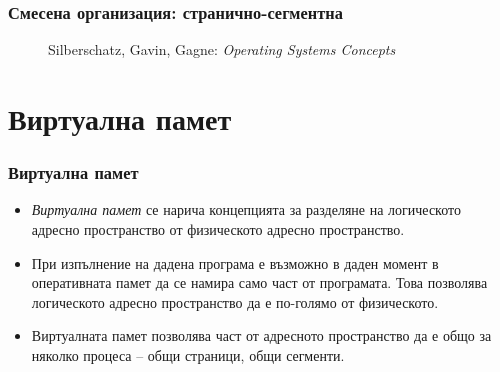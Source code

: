 \documentclass[ignorenonframetext, hyperref=unicode]{beamer}
\begin{document}
\begin{frame}
\frametitle{Смесена организация: странично-сегментна}
\begin{figure}[h]
\center
{}
\caption{Silberschatz, Gavin, Gagne: {\em Operating Systems Concepts}}
\end{figure}
\end{frame}



\section{Виртуална памет}
\begin{frame}
\frametitle{Виртуална памет}
\begin{itemize}
  \item {\em Виртуална памет} се нарича концепцията за разделяне на логическото
  адресно пространство от физическото адресно пространство.
  \item При изпълнение на дадена програма е възможно в даден момент в
  оперативната памет да се намира само част от програмата. Това позволява
  логическото адресно пространство да е по-голямо от физическото.
  \item Виртуалната памет позволява част от адресното пространство да е общо за
   няколко процеса -- общи страници, общи сегменти.
\end{itemize}
\end{frame}
\end{document}
